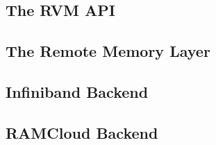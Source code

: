\subsection{The RVM API}



\subsection{The Remote Memory Layer}



\subsection{Infiniband Backend}



\subsection{RAMCloud Backend}


